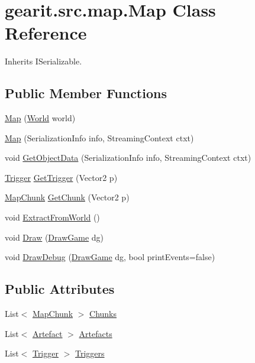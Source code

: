 \hypertarget{classgearit_1_1src_1_1map_1_1_map}{\section{gearit.\+src.\+map.\+Map Class Reference}
\label{classgearit_1_1src_1_1map_1_1_map}
}


Inherits I\+Serializable.

\subsection*{Public Member Functions}
\begin{DoxyCompactItemize}
\item 
\hyperlink{classgearit_1_1src_1_1map_1_1_map_a13e8273e31e8a976e4b3d389d91870e6}{Map} (\hyperlink{class_farseer_physics_1_1_dynamics_1_1_world}{World} world)
\item 
\hyperlink{classgearit_1_1src_1_1map_1_1_map_a6567784cc714ce7075f233588cdce0c8}{Map} (Serialization\+Info info, Streaming\+Context ctxt)
\item 
void \hyperlink{classgearit_1_1src_1_1map_1_1_map_a0d6fa28a473f6af940775cdc9adf5f89}{Get\+Object\+Data} (Serialization\+Info info, Streaming\+Context ctxt)
\item 
\hyperlink{classgearit_1_1src_1_1map_1_1_trigger}{Trigger} \hyperlink{classgearit_1_1src_1_1map_1_1_map_ad878c7f3abd4168f2b2c36f8f1d8650d}{Get\+Trigger} (Vector2 p)
\item 
\hyperlink{classgearit_1_1src_1_1editor_1_1map_1_1_map_chunk}{Map\+Chunk} \hyperlink{classgearit_1_1src_1_1map_1_1_map_a91a393883b7c7e97782022033a17088d}{Get\+Chunk} (Vector2 p)
\item 
void \hyperlink{classgearit_1_1src_1_1map_1_1_map_a42fba9058bd6948eb06d8e8fb0105776}{Extract\+From\+World} ()
\item 
void \hyperlink{classgearit_1_1src_1_1map_1_1_map_a5c74ec9fd09748600208847f5a3a681f}{Draw} (\hyperlink{classgearit_1_1src_1_1_draw_game}{Draw\+Game} dg)
\item 
void \hyperlink{classgearit_1_1src_1_1map_1_1_map_a4299c6202671de476551a6197d936e59}{Draw\+Debug} (\hyperlink{classgearit_1_1src_1_1_draw_game}{Draw\+Game} dg, bool print\+Events=false)
\end{DoxyCompactItemize}
\subsection*{Public Attributes}
\begin{DoxyCompactItemize}
\item 
List$<$ \hyperlink{classgearit_1_1src_1_1editor_1_1map_1_1_map_chunk}{Map\+Chunk} $>$ \hyperlink{classgearit_1_1src_1_1map_1_1_map_a2f224448cfe74111f67cbac2ef5eb862}{Chunks}
\item 
List$<$ \hyperlink{classgearit_1_1src_1_1map_1_1_artefact}{Artefact} $>$ \hyperlink{classgearit_1_1src_1_1map_1_1_map_a5c13ea5c8712d296b450fdc90376e75c}{Artefacts}
\item 
List$<$ \hyperlink{classgearit_1_1src_1_1map_1_1_trigger}{Trigger} $>$ \hyperlink{classgearit_1_1src_1_1map_1_1_map_a956469edb846fff301c908e8bf38677b}{Triggers}
\end{DoxyCompactItemize}

